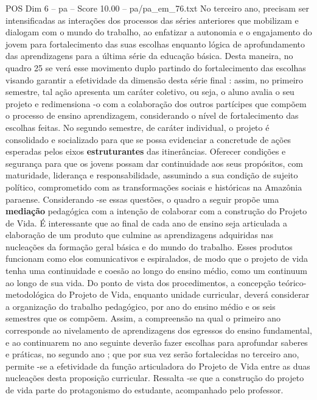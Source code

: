 \begin{textsample}{POS Dim 6 – pa – Score 10.00 – pa/pa\_em\_76.txt}  \label{ex:f6_pos_064}
No terceiro ano, precisam ser intensificadas as interações dos processos das séries anteriores que mobilizam e dialogam com o mundo do trabalho, ao enfatizar a autonomia e o engajamento do jovem para fortalecimento das suas escolhas enquanto lógica de aprofundamento das aprendizagens para a última série da educação básica.
Desta maneira, no quadro 25 se verá esse movimento duplo partindo do fortalecimento das escolhas visando garantir a efetividade da dimensão desta série final : assim, no primeiro semestre, tal ação apresenta um caráter coletivo, ou seja, o aluno avalia o seu projeto e redimensiona -o com a colaboração dos outros partícipes que compõem o processo de ensino aprendizagem, considerando o nível de fortalecimento das escolhas feitas.
No segundo semestre, de caráter individual, o projeto é consolidado e socializado para que se possa evidenciar a concretude de ações esperadas pelos eixos \textbf{estruturantes} das itinerâncias.
Oferecer condições e segurança para que os jovens possam dar continuidade aos seus propósitos, com maturidade, liderança e responsabilidade, assumindo a sua condição de sujeito político, comprometido com as transformações sociais e históricas na Amazônia paraense.
Considerando -se essas questões, o quadro a seguir propõe uma \textbf{mediação} pedagógica com a intenção de colaborar com a construção do Projeto de Vida.
É interessante que ao final de cada ano de ensino seja articulada a elaboração de um produto que culmine as aprendizagens adquiridas nas nucleações da formação geral básica e do mundo do trabalho.
Esses produtos funcionam como elos comunicativos e espiralados, de modo que o projeto de vida tenha uma continuidade e coesão ao longo do ensino médio, como um continuum ao longo de sua vida.
Do ponto de vista dos procedimentos, a concepção teórico-metodológica do Projeto de Vida, enquanto unidade curricular, deverá considerar a organização do trabalho pedagógico, por ano do ensino médio e os seis semestres que os compõem.
Assim, a compreensão na qual o primeiro ano corresponde ao nivelamento de aprendizagens dos egressos do ensino fundamental, e ao continuarem no ano seguinte deverão fazer escolhas para aprofundar saberes e práticas, no segundo ano ; que por sua vez serão fortalecidas no terceiro ano, permite -se a efetividade da função articuladora do Projeto de Vida entre as duas nucleações desta proposição curricular.
Ressalta -se que a construção do projeto de vida parte do protagonismo do estudante, acompanhado pelo professor.

\end{textsample}
